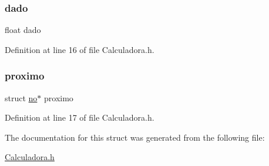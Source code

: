 \subsubsection{\texorpdfstring{dado}{dado}}
{\footnotesize\ttfamily float dado}



Definition at line 16 of file Calculadora.\+h.

\mbox{\label{structno_ac5dac914c4194e089f197231896fa8e0}} 
\subsubsection{\texorpdfstring{proximo}{proximo}}
{\footnotesize\ttfamily struct \mbox{\hyperlink{structno}{no}}$\ast$ proximo}



Definition at line 17 of file Calculadora.\+h.



The documentation for this struct was generated from the following file\+:\begin{DoxyCompactItemize}
\item 
\mbox{\hyperlink{_calculadora_8h}{Calculadora.\+h}}\end{DoxyCompactItemize}
